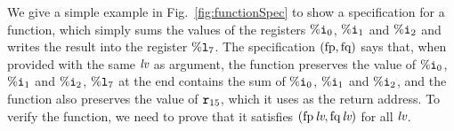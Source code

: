 We give a simple example in Fig.~\ref{fig:functionSpec}
to show a specification for a function,
which simply
sums the values of the registers $\%\texttt{i}_{0}$, $\%\texttt{i}_{1}$ and $\%\texttt{i}_{2}$
and writes the result into the register $\%\texttt{l}_{7}$.
The specification $(\text{fp},\text{fq})$ says that, when
provided with the same $\textit{lv}$ as argument, the function
preserves the value of $\%\texttt{i}_{0}$, $\%\texttt{i}_{1}$ and $\%\texttt{i}_{2}$,
$\%\texttt{l}_{7}$ at the end contains the sum of $\%\texttt{i}_{0}$, $\%\texttt{i}_{1}$ and $\%\texttt{i}_{2}$, and the function also preserves the value of $\texttt{r}_{15}$,
which it uses as the return address.
To verify the function, we need to prove that it satisfies
$(\text{fp}\,\textit{lv}, \text{fq}\,\textit{lv})$ for all $\textit{lv}$.




